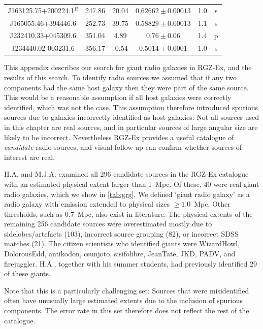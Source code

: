 \begin{table}
\begin{footnotesize}
\begin{tabular}{c|ccccc}
    J163125.75+200224.1${}^R$ & 247.86 & 20.04 & $0.62662 \pm 0.00013$ & 1.0 & s\\ %
    J165055.46+394446.6 & 252.73 & 39.75 & $0.58829 \pm 0.00013$ & 1.1 & s\\ %
    J232410.33+045309.6 & 351.04 & 4.89 & $0.76 \pm 0.06$ & 1.4 & p\\ %
    J234440.02-003231.6 & 356.17 & -0.54 & $0.5014 \pm 0.0001$ & 1.0 & s\\ %
      \hline\hline
      \end{tabular}\end{footnotesize}
    \end{table}

    This appendix describes our search for giant radio galaxies in RGZ-Ex, and the results of this search. To identify radio sources we assumed that if any two components had the same host galaxy then they were part of the same source. This would be a reasonable assumption if all host galaxies were correctly identified, which was not the case. This assumption therefore introduced spurious sources due to galaxies incorrectly identified as host galaxies: Not all sources used in this chapter are real sources, and in particular sources of large angular size are likely to be incorrect. Nevertheless RGZ-Ex provides a useful catalogue of \emph{candidate} radio sources, and visual follow-up can confirm whether sources of interest are real.

    H.A. and M.J.A. examined all 296 candidate sources in the RGZ-Ex catalogue with an estimated physical extent larger than 1~Mpc. Of these, 40 were real giant radio galaxies, which we show in \autoref{tab:grg}. We defined `giant radio galaxy' as a radio galaxy with emission extended to physical sizes $\geq 1.0$~Mpc. Other thresholds, such as $0.7$~Mpc, also exist in literature. The physical extents of the remaining 256 candidate sources were overestimated
mostly due to sidelobes/artefacts (103), incorrect source grouping (82), or incorrect SDSS matches (21). The citizen scientists who identified giants were WizardHowl, DolorousEdd, antikodon, csunjoto, sisifolibre, JeanTate, JKD, PADV, and firejuggler. H.A., together with his summer students, had previously identified 29 of these giants.

    Note that this is a particularly challenging set: Sources that were misidentified often have unusually large estimated extents due to the inclusion of spurious components. The error rate in this set therefore does not reflect the rest of the catalogue.

\unappendix
